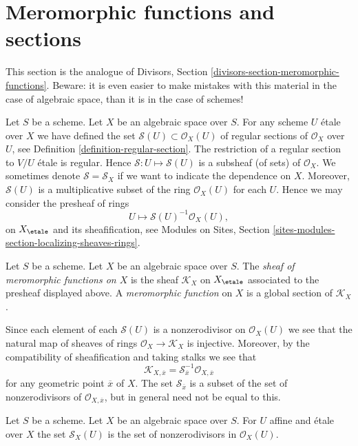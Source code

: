 \section{Meromorphic functions and sections}
\label{section-meromorphic-functions}

\noindent
This section is the analogue of
Divisors, Section \ref{divisors-section-meromorphic-functions}.
Beware: it is even easier to make mistakes with this material in the
case of algebraic space, than it is in the case of schemes!

\medskip\noindent
Let $S$ be a scheme. Let $X$ be an algebraic space over $S$.
For any scheme $U$ \'etale over $X$ we have defined the set
$\mathcal{S}(U) \subset \mathcal{O}_X(U)$
of regular sections of $\mathcal{O}_X$ over $U$, see
Definition \ref{definition-regular-section}. The restriction
of a regular section to $V/U$ \'etale is regular. Hence
$\mathcal{S} : U \mapsto \mathcal{S}(U)$ is a subsheaf (of sets)
of $\mathcal{O}_X$. We sometimes denote $\mathcal{S} = \mathcal{S}_X$
if we want to indicate the dependence on $X$.
Moreover, $\mathcal{S}(U)$
is a multiplicative subset of the ring $\mathcal{O}_X(U)$ for
each $U$. Hence we may consider
the presheaf of rings
$$
U \longmapsto \mathcal{S}(U)^{-1} \mathcal{O}_X(U),
$$
on $X_\etale$ and its sheafification, see
Modules on Sites, Section \ref{sites-modules-section-localizing-sheaves-rings}.

\begin{definition}
\label{definition-sheaf-meromorphic-functions}
Let $S$ be a scheme. Let $X$ be an algebraic space over $S$.
The {\it sheaf of meromorphic functions on $X$} is
the sheaf {\it $\mathcal{K}_X$} on $X_\etale$ associated to the presheaf
displayed above. A {\it meromorphic function} on $X$
is a global section of $\mathcal{K}_X$.
\end{definition}

\noindent
Since each element of each $\mathcal{S}(U)$ is a nonzerodivisor on
$\mathcal{O}_X(U)$ we see that the natural map of sheaves
of rings $\mathcal{O}_X \to \mathcal{K}_X$ is injective.
Moreover, by the compatibility of sheafification and taking stalks
we see that
$$
\mathcal{K}_{X, \overline{x}} =
\mathcal{S}_{\overline{x}}^{-1}\mathcal{O}_{X, \overline{x}}
$$
for any geometric point $\overline{x}$ of $X$. The set
$\mathcal{S}_{\overline{x}}$ is a subset of
the set of nonzerodivisors of $\mathcal{O}_{X, \overline{x}}$, but
in general need not be equal to this.

\begin{lemma}
\label{lemma-describe-S}
Let $S$ be a scheme. Let $X$ be an algebraic space over $S$.
For $U$ affine and \'etale over $X$ the set
$\mathcal{S}_X(U)$ is the set of nonzerodivisors in
$\mathcal{O}_X(U)$.
\end{lemma}

